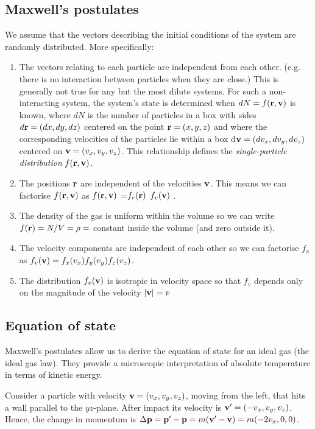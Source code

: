 \subsection{Maxwell's postulates}
We assume that the vectors describing the initial conditions of the system are randomly distributed. More specifically:
\begin{enumerate}
\item The vectors relating to each particle are independent from each other. (e.g. there is no interaction between particles when they are close.) This is generally not true for any but the most dilute systems. For such a non-interacting system, the system's state is determined when $dN=f({\bf r},{\bf v})$ is known, where $dN$ is the number of particles in a box with sides $d{\bf r}=(dx,dy,dz)$ centered on the point ${\bf r} = (x,y,z)$ and where the corresponding velocities of the particles lie within a box d${\bf v}=(dv_x,dv_y,dv_z)$ centered on ${\bf v}=(v_x,v_y,v_z)$. This relationship defines the \emph{single-particle distribution} $f({\bf r},{\bf v})$.
\item The positions ${\bf r}$ are independent of the velocities ${\bf v}$. This means we can factorise $f({\bf r},{\bf v})$ as $f({\bf r},{\bf v})$ =$f_r({\bf r})$ $f_v({\bf v})$ .
\item The density of the gas is uniform within the volume so we can write $f({\bf r}) = N/V=\rho=$ constant inside the volume (and zero outside it).
\item The velocity components are independent of each other so we can factorise $f_v$ as $f_v({\bf v})=f_x(v_x)f_y(v_y)f_z(v_z)$.
\item The distribution $f_v({\bf v})$ is isotropic in velocity space so that $f_v$ depends only on the magnitude of the velocity $|{\bf v}| = v$
\end{enumerate}

\subsection{Equation of state}
Maxwell's postulates allow us to derive the equation of state for an ideal gas (the ideal gas law). They provide a microscopic interpretation of absolute temperature in terms of kinetic energy.

Consider a particle with velocity ${\bf v} = (v_x,v_y,v_z)$, moving from the left, that hits a wall parallel to the $yz$-plane. After impact its velocity is ${\bf v'}=(-v_x,v_y,v_z)$. Hence, the change in momentum is $\Delta {\bf p}= {\bf p'} - {\bf p} = m({\bf v'}-{\bf v}) = m(-2v_x,0,0)$.

